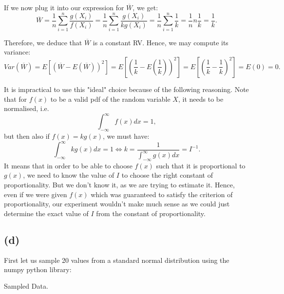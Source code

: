 \documentclass[12pt]{article}
\newcommand\W{\overline{W}}
\newcommand\intR{\int_{-\infty}^\infty}
\begin{document}
If we now plug it into our expression for $ \overline{W} $, we get:
\[ \overline{W} = \frac{1}{n} \sum_{i=1}^n \frac{g(X_i)}{f(X_i)} 
= \frac{1}{n} \sum_{i=1}^n \frac{g(X_i)}{kg(X_i)} =\frac{1}{n} \sum_{i=1}^n \frac{1}{k} 
= \frac{1}{n} n \frac{1}{k} = \frac{1}{k}.  \]

Therefore, we deduce that $ \overline{W} $ is a constant RV. Hence, we may compute its variance:
\[ Var(\W) = E\left[(\W - E(\W))^2\right] = E \left[ (\frac{1}{k} - E(\frac{1}{k}))^2 \right]
= E \left[ (\frac{1}{k} - \frac{1}{k})^2 \right] = E (0) = 0.\]

It is impractical to use this "ideal" choice because of the following reasoning. Note that for $ f(x) $ to 
be a valid pdf of the random variable $ X $, it needs to be normalised, i.e. 
\[ \intR f(x)dx = 1,\]
but then also if $ f(x) = kg(x) $, we must have:
\[ \intR kg(x)dx = 1 \iff k = \dfrac{1}{\intR g(x)dx} = I^{-1}. \]
It means that in order to be able to choose $f(x)$ such that it is proportional to $g(x)$, we need to know 
the value of $ I $ to choose the right constant of proportionality. But we don't know it, as we are trying to estimate it.
Hence, even if we were given $f(x)$ which was guaranteed to satisfy the criterion of proportionality, 
our experiment wouldn't make much sense as we could just determine the exact value of $ I $ 
from the constant of proportionality.

\subsection*{(d)}

First let us sample 20 values from  a standard normal distribution using the numpy python library: 
\begin{center}
  \begin{table}[H]\centering

  \caption{Sampled Data.}
  \end{table}
\end{center}
\end{document}

